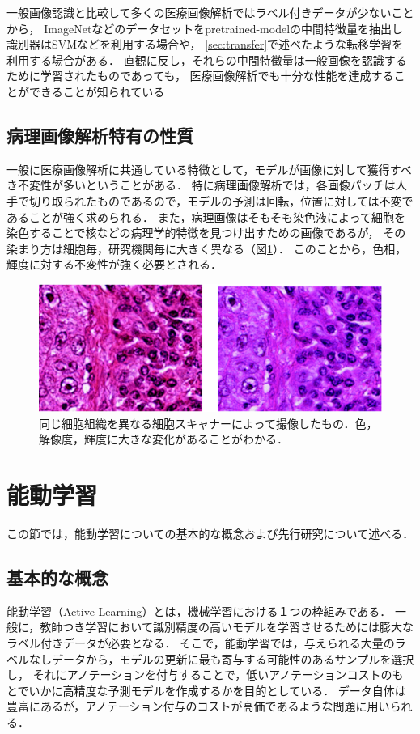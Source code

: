 一般画像認識と比較して多くの医療画像解析ではラベル付きデータが少ないことから，
ImageNetなどのデータセットをpretrained-modelの中間特徴量を抽出し識別器はSVMなどを利用する場合や，
\ref{sec:transfer}で述べたような転移学習を利用する場合がある．
直観に反し，それらの中間特徴量は一般画像を認識するために学習されたものであっても，
医療画像解析でも十分な性能を達成することができることが知られている\cite{li2014medical, tajbakhsh2016convolutional}

\subsection{病理画像解析特有の性質}
一般に医療画像解析に共通している特徴として，モデルが画像に対して獲得すべき不変性が多いということがある．
特に病理画像解析では，各画像パッチは人手で切り取られたものであるので，モデルの予測は回転，位置に対しては不変であることが強く求められる．
また，病理画像はそもそも染色液によって細胞を染色することで核などの病理学的特徴を見つけ出すための画像であるが，
その染まり方は細胞毎，研究機関毎に大きく異なる（図\ref{fig:comparison_color}）．
このことから，色相，輝度に対する不変性が強く必要とされる．

\begin{figure}[tbp]
     \begin{center}
      \includegraphics[width=13cm]{figures/comparison_color.pdf}
     \end{center}
    \caption{\label{fig:comparison_color}同じ細胞組織を異なる細胞スキャナーによって撮像したもの．色，解像度，輝度に大きな変化があることがわかる．}
\end{figure}

\section{能動学習}
\label{seq:al}
この節では，能動学習についての基本的な概念および先行研究について述べる．

\subsection{基本的な概念}
能動学習（Active Learning）\cite{settles2010active}とは，機械学習における１つの枠組みである．
一般に，教師つき学習において識別精度の高いモデルを学習させるためには膨大なラベル付きデータが必要となる．
そこで，能動学習では，与えられる大量のラベルなしデータから，モデルの更新に最も寄与する可能性のあるサンプルを選択し，
それにアノテーションを付与することで，低いアノテーションコストのもとでいかに高精度な予測モデルを作成するかを目的としている．
データ自体は豊富にあるが，アノテーション付与のコストが高価であるような問題に用いられる．

